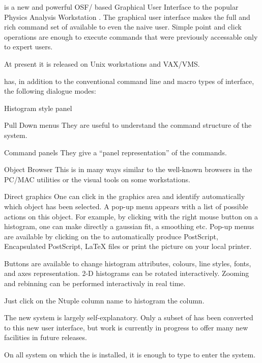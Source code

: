 \PAWPP{} is a new and powerful OSF/\MOTIF{} based Graphical User Interface to
the popular Physics Analysis Workstation \XPAW.  The graphical user interface
makes the full and rich command set of \XPAW{} available to even the naive
user. Simple point and click operations are enough to execute commands that
were previously accessable only to expert users.

At present it is released on Unix workstations and VAX/VMS.

\PAWPP{} has, in addition to the conventional command line and macro types of
interface, the following dialogue modes:

\begin{DL}{Histogram style panel}
\item[Pull Down menus] They are useful to understand the command structure of
      the \XPAW{} system.
\item[Command panels] They give a ``panel representation'' of the commands.
\item[Object Browser] This is in many ways similar to the well-known browsers
      in the PC/MAC utilities or the visual tools on some workstations.
\item[Direct graphics] One can click in the graphics area and identify
      automatically which object has been selected. A pop-up menu appears
      with a list of possible actions on this object. For example, by clicking
      with the right mouse button on a histogram, one can make directly a
      gaussian fit, a smoothing etc.
      Pop-up menus are available by clicking on the \GW{} to
      automatically produce PostScript, Encapsulated PostScript, \LaTeX{} files
      or print the picture on your local printer.
\item[\HSP] Buttons are available to change
      histogram attributes, colours, line styles, fonts, and
      axes representation.
      2-D histograms can be rotated interactively. Zooming and rebinning can
      be performed interactivaly in real time.
\item[\NV] Just click on the Ntuple column name to histogram
      the column.
\end{DL}

The new system is largely self-explanatory. Only a subset of \XPAW{} has been
converted to this new user interface, but work is currently in progress to
offer many new facilities in future releases.

On all system on which the \CERNLIB{} is installed, it is enough to
type  to enter the system.

